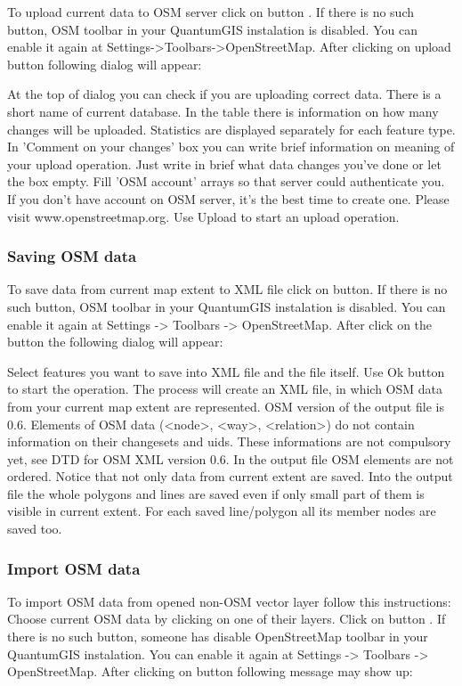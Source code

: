 To upload current data to OSM server click on  button   .
If there is no such button, OSM toolbar in your QuantumGIS instalation is
disabled. You can enable it again at Settings->Toolbars->OpenStreetMap.
After clicking on upload button following dialog will appear:

At the top of dialog you can check if you are uploading correct data. There
is a short name of current database. In the table there is information on how
many changes will be uploaded. Statistics are displayed separately for each
feature type.
In 'Comment on your changes' box you can write brief information on meaning
of your upload operation. Just write in brief what data changes you've done
or let the box empty.
Fill 'OSM account' arrays so that server could authenticate you. If you don't
have account on OSM server, it's the best time to create one. Please visit
www.openstreetmap.org.
Use Upload to start an upload operation.

\subsubsection{Saving OSM data}  

To save data from current map extent to XML file click on 
 button.
If there is no such button, OSM toolbar in your QuantumGIS instalation is
disabled. You can enable it again at Settings -> Toolbars -> OpenStreetMap.
After click on the button the following dialog will appear:

Select features you want to save into XML file and the file itself.
Use Ok button to start the operation.
The process will create an XML file, in which OSM data from your current map
extent are represented. OSM version of the output file is 0.6. Elements of
OSM data (<node>, <way>, <relation>) do not contain information on their
changesets and uids. These informations are not compulsory yet, see DTD for
OSM XML version 0.6.
In the output file OSM elements are not ordered.
Notice that not only data from current extent are saved. Into the output file
the whole polygons and lines are saved even if only small part of them is
visible in current extent. For each saved line/polygon all its member nodes
are saved too.

\subsubsection{Import OSM data}  

To import OSM data from opened non-OSM vector layer follow this instructions:
Choose current OSM data by clicking on one of their layers.
Click on  button   .
If there is no such button, someone has disable OpenStreetMap toolbar in your
QuantumGIS instalation. You can enable it again at
Settings -> Toolbars -> OpenStreetMap.
After clicking on button following message may show up:

